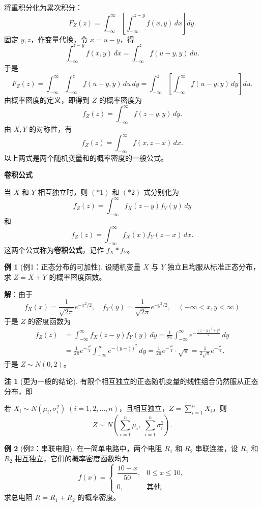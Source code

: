 \documentclass[11pt,a4paper]{report}
\theoremstyle{definition}
\newtheorem{example}{例}[chapter]
\newtheorem{note}{注}[chapter]
\begin{document}
将重积分化为累次积分：
\[
F_{Z}(z)=\int_{-\infty}^{\infty}\left[\int_{-\infty}^{z-y}f(x,y)\,dx\right]dy.
\]
固定 $y,z$，作变量代换，令 $x=u-y$，得
\[
\int_{-\infty}^{z-y}f(x,y)\,dx=\int_{-\infty}^{z}f(u-y,y)\,du.
\]
于是
\[
F_{Z}(z)=\int_{-\infty}^{\infty}\int_{-\infty}^{z}f(u-y,y)\,du\,dy
=\int_{-\infty}^{z}\left[\int_{-\infty}^{\infty}f(u-y,y)\,dy\right]du.
\]
由概率密度的定义，即得到 $Z$ 的概率密度为
\[
\boxed{f_{Z}(z)=\int_{-\infty}^{\infty}f(z-y,y)\,dy}. \tag{*1}
\]
由 $X,Y$ 的对称性，有
\[
\boxed{f_{Z}(z)=\int_{-\infty}^{\infty}f(x,z-x)\,dx}. \tag{*2}
\]
以上两式是两个随机变量和的概率密度的一般公式。

\textbf{卷积公式}

当 $X$ 和 $Y$ 相互独立时，则 $(*1)$ 和 $(*2)$ 式分别化为
\[
\boxed{f_{Z}(z)=\int_{-\infty}^{\infty}f_{X}(z-y)f_{Y}(y)\,dy}
\]
和
\[
\boxed{f_{Z}(z)=\int_{-\infty}^{\infty}f_{X}(x)f_{Y}(z-x)\,dx}.
\]
这两个公式称为\textbf{卷积公式}，记作 $f_{X}*f_{Y}$。

\begin{example}[例1：正态分布的可加性]
设随机变量 $X$ 与 $Y$ 独立且均服从标准正态分布，求 $Z=X+Y$ 的概率密度函数。
\end{example}

\textbf{解}：由于
\[
f_{X}(x)=\frac{1}{\sqrt{2\pi}}e^{-x^{2}/2},\quad
f_{Y}(y)=\frac{1}{\sqrt{2\pi}}e^{-y^{2}/2},\quad
(-\infty<x,y<\infty)
\]
于是 $Z$ 的密度函数为
\begin{align*}
f_{Z}(z)&=\int_{-\infty}^{\infty}f_{X}(z-y)f_{Y}(y)\,dy
=\frac{1}{2\pi}\int_{-\infty}^{\infty}e^{-\frac{(z-y)^{2}+y^{2}}{2}}\,dy\\
&=\frac{1}{2\pi}e^{-\frac{z^{2}}{4}}\int_{-\infty}^{\infty}e^{-\left(y-\frac{z}{2}\right)^{2}}\,dy
=\frac{1}{2\pi}e^{-\frac{z^{2}}{4}}\cdot\sqrt{\pi}
=\frac{1}{2\sqrt{\pi}}e^{-\frac{z^{2}}{4}}.
\end{align*}
于是 $Z\sim N(0,2)$。

\begin{note}[更为一般的结论]
有限个相互独立的正态随机变量的线性组合仍然服从正态分布，即

若 $X_{i}\sim N(\mu_{i},\sigma_{i}^{2})\;(i=1,2,\dots,n)$，且相互独立，$Z=\sum_{i=1}^{n}X_{i}$，则
\[
\boxed{Z\sim N\left(\sum_{i=1}^{n}\mu_{i},\;\sum_{i=1}^{n}\sigma_{i}^{2}\right)}.
\]
\end{note}

\begin{example}[例2：串联电阻]
在一简单电路中，两个电阻 $R_{1}$ 和 $R_{2}$ 串联连接，设 $R_{1}$ 和 $R_{2}$ 相互独立，它们的概率密度函数均为
\[
f(x)=
\begin{cases}
\dfrac{10-x}{50}, & 0\leq x\leq 10,\\[0.5em]
0, & \text{其他},
\end{cases}
\]
求总电阻 $R=R_{1}+R_{2}$ 的概率密度。
\end{example}
\end{document}

